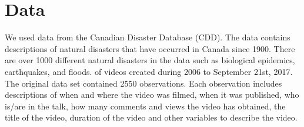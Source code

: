 \section{Data}
We used data from the Canadian Disaster Database (CDD). 
The data contains descriptions of natural disasters that have occurred in Canada since 1900. There are over 1000 different natural disasters in the data such as biological epidemics, earthquakes, and floods.  
  of videos created during 2006 to September 21st, 2017. The original data set contained 2550 observations. Each observation includes descriptions of when and where the video was filmed, when it was published, who is/are in the talk, how many comments and views the video has obtained, the title of the video, duration of the video and other variables to describe the video.